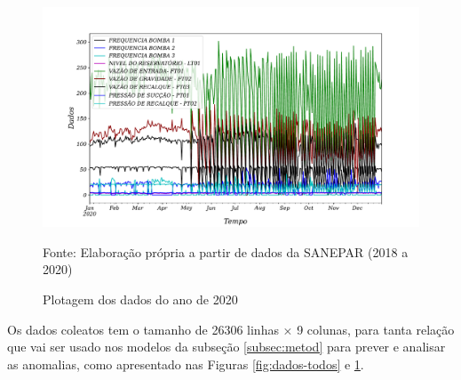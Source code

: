 \begin{figure}[H]
	\centering
	\caption{Plotagem dos dados do ano de 2020}
	\label{fig:2020-a-frente}
	\includegraphics[width=1\linewidth]{"Introducao/Figuras/2020 a frente"}
	
	Fonte: Elaboração própria a partir de dados da SANEPAR (2018 a 2020)
\end{figure}

Os dados coleatos tem o tamanho de 26306 linhas × 9 colunas, para tanta relação que vai ser usado nos modelos da subseção \ref{subsec:metod} para prever e analisar as anomalias, como apresentado nas Figuras \ref{fig:dados-todos} e \ref{fig:2020-a-frente}.




